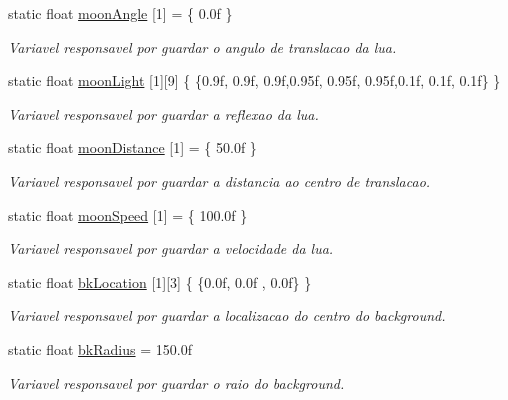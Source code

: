 \begin{DoxyCompactItemize}
static float \mbox{\hyperlink{class_scene_texture_a679a4ff577f9a7a82018aff021a94c13}{moon\+Angle}} \mbox{[}1\mbox{]} = \{ 0.\+0f \}
\begin{DoxyCompactList}\small\item\em Variavel responsavel por guardar o angulo de translacao da lua. \end{DoxyCompactList}\item 
static float \mbox{\hyperlink{class_scene_texture_ab73f47bec9999c6183e98279b5d29be6}{moon\+Light}} \mbox{[}1\mbox{]}\mbox{[}9\mbox{]} \{ \{0.\+9f, 0.\+9f, 0.\+9f,0.\+95f, 0.\+95f, 0.\+95f,0.\+1f, 0.\+1f, 0.\+1f\} \}
\begin{DoxyCompactList}\small\item\em Variavel responsavel por guardar a reflexao da lua. \end{DoxyCompactList}\item 
static float \mbox{\hyperlink{class_scene_texture_abb843fec1a05d24bb5ae6a9795cab5c7}{moon\+Distance}} \mbox{[}1\mbox{]} = \{ 50.\+0f \}
\begin{DoxyCompactList}\small\item\em Variavel responsavel por guardar a distancia ao centro de translacao. \end{DoxyCompactList}\item 
static float \mbox{\hyperlink{class_scene_texture_ae86479797b3e8f1afb9dc59c83534686}{moon\+Speed}} \mbox{[}1\mbox{]} = \{ 100.\+0f \}
\begin{DoxyCompactList}\small\item\em Variavel responsavel por guardar a velocidade da lua. \end{DoxyCompactList}\item 
static float \mbox{\hyperlink{class_scene_texture_a504efd019f30eae4e8dcbda77d48ffbb}{bk\+Location}} \mbox{[}1\mbox{]}\mbox{[}3\mbox{]} \{ \{0.\+0f, 0.\+0f , 0.\+0f\} \}
\begin{DoxyCompactList}\small\item\em Variavel responsavel por guardar a localizacao do centro do background. \end{DoxyCompactList}\item 
static float \mbox{\hyperlink{class_scene_texture_a7dd286541ee06b8cd2ac2f0a158b4502}{bk\+Radius}} = 150.\+0f
\begin{DoxyCompactList}\small\item\em Variavel responsavel por guardar o raio do background. \end{DoxyCompactList}\item 

\end{DoxyCompactItemize}
